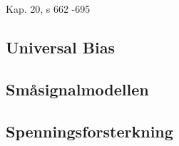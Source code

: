 Kap. 20, s 662 -695

\subsection{Universal Bias}


\subsection{Småsignalmodellen}


\subsection{Spenningsforsterkning}

